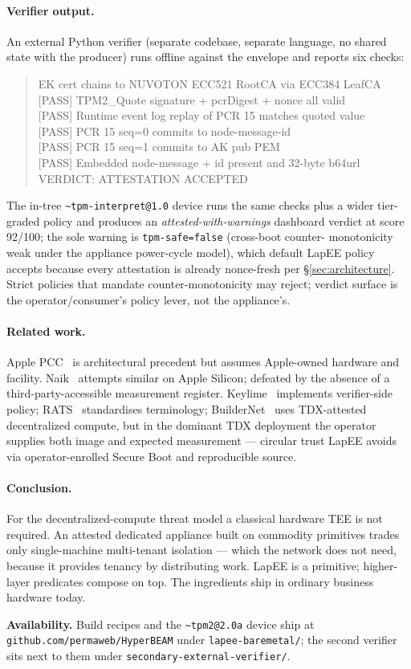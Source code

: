 \documentclass[10pt,a4paper]{article}
\begin{document}
\paragraph{Verifier output.} An external Python verifier (separate
codebase, separate language, no shared state with the producer) runs
offline against the envelope and reports six checks:
\begin{quote}\footnotesize\ttfamily
[PASS] EK cert chains to NUVOTON ECC521 RootCA via ECC384 LeafCA\\
{}[PASS] TPM2\_Quote signature + pcrDigest + nonce all valid\\
{}[PASS] Runtime event log replay of PCR 15 matches quoted value\\
{}[PASS] PCR 15 seq=0 commits to node-message-id\\
{}[PASS] PCR 15 seq=1 commits to AK pub PEM\\
{}[PASS] Embedded node-message + id present and 32-byte b64url\\
VERDICT: ATTESTATION ACCEPTED
\end{quote}
The in-tree \texttt{\~{}tpm-interpret@1.0} device runs the same checks
plus a wider tier-graded policy and produces an
\emph{attested-with-warnings} dashboard verdict at score 92/100; the
sole warning is \texttt{tpm-safe=false} (cross-boot counter-
monotonicity weak under the appliance power-cycle model), which
default LapEE policy accepts because every attestation is already
nonce-fresh per \S\ref{sec:architecture}. Strict policies that
mandate counter-monotonicity may reject; verdict surface is the
operator/consumer's policy lever, not the appliance's.

\paragraph{Related work.} Apple PCC~\cite{apple-pcc} is architectural
precedent but assumes Apple-owned hardware and facility.
Naik~\cite{naik-dginf} attempts similar on Apple Silicon; defeated by
the absence of a third-party-accessible measurement register.
Keylime~\cite{keylime} implements verifier-side policy;
RATS~\cite{rfc9334} standardises terminology;
BuilderNet~\cite{flashbots-buildernet} uses TDX-attested decentralized
compute, but in the dominant TDX deployment the operator supplies both
image and expected measurement --- circular trust LapEE avoids via
operator-enrolled Secure Boot and reproducible source.

\paragraph{Conclusion.} For the decentralized-compute threat model a
classical hardware TEE is not required. An attested dedicated appliance
built on commodity primitives trades only single-machine multi-tenant
isolation --- which the network does not need, because it provides
tenancy by distributing work. LapEE is a primitive; higher-layer
predicates compose on top. The ingredients ship in ordinary business
hardware today.

\vspace{0.4em}
\noindent\footnotesize\textbf{Availability.} Build recipes and the
\texttt{\~{}tpm2@2.0a} device ship at
\texttt{github.com/permaweb/HyperBEAM} under \texttt{lapee-baremetal/};
the second verifier sits next to them under
\texttt{secondary-external-verifier/}.

\printbibliography
\end{document}
